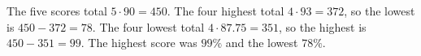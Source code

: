 The five scores total $5\cdot90=450$. The four highest total $4\cdot93=372$, so the lowest is $450-372=78$. The four lowest total $4\cdot87.75=351$, so the highest is $450-351=99$. The highest score was $\boxed{99\%}$ and the lowest $\boxed{78\%}$.
